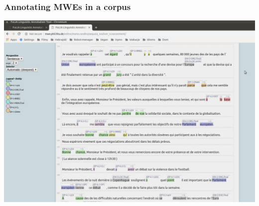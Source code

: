 \documentclass[xcolor=dvipsnames]{beamer}
\begin{document}
\begin{frame} 
\frametitle{Annotating MWEs in a corpus}

\includegraphics[scale=0.23]{Images/flat.png}

\end{frame}
\end{document}
